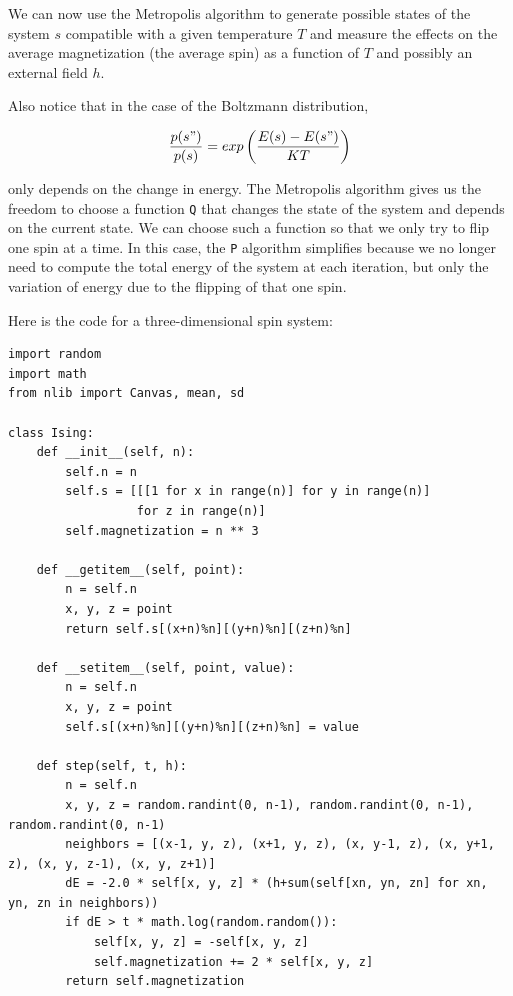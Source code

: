 \documentclass[justified, sixbynine]{tufte-book}
\def\ft{\small\tt}
\theoremstyle{plain}%
\newtheorem * {corollary}{Corollary}
\theoremstyle{definition}
\theoremstyle{remark}
\newtheorem * {remark}{Remark}
\newtheorem * {note}{Note}
\begin{document}
\begin{fullwidth}
We can now use the Metropolis algorithm to generate possible states of the system $s$ compatible with a given temperature $T$ and measure the effects on the average magnetization (the average spin) as a function of $T$ and possibly an external field $h$.

Also notice that in the case of the Boltzmann distribution, 

\begin{equation}
\frac{p(s")}{p(s)} = exp\left(\frac{E(s)-E(s")}{KT}\right)
\end{equation}

only depends on the change in energy. The Metropolis algorithm gives us the freedom to choose a function {\ft Q} that changes the state of the system and depends on the current state. We can choose such a function so that we only try to flip one spin at a time. In this case, the {\ft P} algorithm simplifies because we no longer need to compute the total energy of the system at each iteration, but only the variation of energy due to the flipping of that one spin.

Here is the code for a three-dimensional spin system:


\begin{lstlisting}[caption={in file: {\ft ising.py}}]
import random
import math
from nlib import Canvas, mean, sd

class Ising:
    def __init__(self, n):
        self.n = n
        self.s = [[[1 for x in range(n)] for y in range(n)]
                  for z in range(n)]
        self.magnetization = n ** 3

    def __getitem__(self, point):
        n = self.n
        x, y, z = point
        return self.s[(x+n)%n][(y+n)%n][(z+n)%n]

    def __setitem__(self, point, value):
        n = self.n
        x, y, z = point
        self.s[(x+n)%n][(y+n)%n][(z+n)%n] = value

    def step(self, t, h):
        n = self.n
        x, y, z = random.randint(0, n-1), random.randint(0, n-1), random.randint(0, n-1)
        neighbors = [(x-1, y, z), (x+1, y, z), (x, y-1, z), (x, y+1, z), (x, y, z-1), (x, y, z+1)]
        dE = -2.0 * self[x, y, z] * (h+sum(self[xn, yn, zn] for xn, yn, zn in neighbors))
        if dE > t * math.log(random.random()):
            self[x, y, z] = -self[x, y, z]
            self.magnetization += 2 * self[x, y, z]
        return self.magnetization


\end{lstlisting}
\end{fullwidth}
\end{document}
